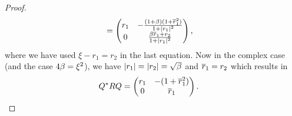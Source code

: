\begin{proof}
\begin{align*}
		&=\begin{pmatrix}
			r_1
			& -\frac{(1+\beta)(1+\overline{r}_1^2)}{1+|r_1|^2} \\
			0 &  \frac{\beta\overline{r}_1 + r_2}{1+|r_1|^2}
		\end{pmatrix},
	\end{align*}
	where we have used \(\xi - r_1 = r_2\) in the last equation. Now in the complex
	case (and the case \(4\beta = \xi^2\)), we have
	\(|r_1|=|r_2|=\sqrt{\beta}\) and \(\overline{r}_1 = r_2\) which results
	in
	\begin{align*}
		Q^* R Q
		&=\begin{pmatrix}
			r_1
			& -(1+\overline{r}_1^2) \\
			0 & \overline{r}_1 
		\end{pmatrix}.
		\qedhere
	\end{align*}
\end{proof}


